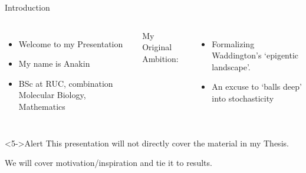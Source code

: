 \documentclass[aspectratio=169, onlytextwidth,  notheorems, sOuRcEs, fleqn, leqno, ]{RUCPresentation}
\begin{document}
\begin{frame}{Introduction}



    \begin{columns}[T]

        \column{0.50\framewidth}
        \begin{itemize}
            \item Welcome to my Presentation
            \item My name is Anakin
            \item<3-> BSc  at RUC, combination Molecular Biology, Mathematics
        \end{itemize}

        My Original Ambition:
        \begin{itemize}
            \item Formalizing Waddington's `epigentic landscape'.%
            \item An excuse to `balls deep' into stochasticity
        \end{itemize}
    \end{columns}

    \begin{alertblock}<5->{Alert}
        This presentation will not directly cover the material in my Thesis.\par
        We will cover motivation/inspiration and tie it to results.
    \end{alertblock}

\end{frame}



\end{document}
